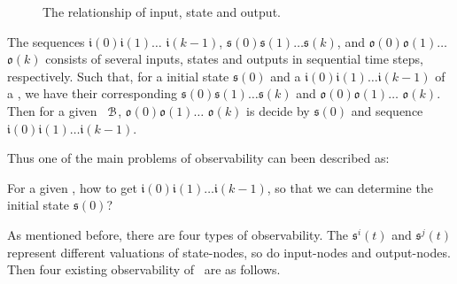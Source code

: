  \begin{figure}[thpb]
      \centering
      
      \caption{The relationship of input, state and output.}
      \label{fig:10}
  \end{figure}
   The sequences $\mathfrak{i}(0)$$\mathfrak{i}(1)\ldots$
$\mathfrak{i}(k-1)$,  $\mathfrak{s}(0) $$\mathfrak{s}(1)\ldots$$\mathfrak{s}(k)$, and $\mathfrak{o}(0)$$\mathfrak{o}(1)\ldots$$\mathfrak{o}(k)$ 
 consists of several inputs, states and outputs  in sequential time steps,  respectively. 
 Such that, for a initial state $\mathfrak{s}(0)$ and a $\mathfrak{i}(0)$$\mathfrak{i}(1)\ldots$$\mathfrak{i}(k-1)$ of a \BCN, we have their corresponding 
$\mathfrak{s}(0)$$\mathfrak{s}(1)\ldots $$\mathfrak{s}(k)$ and $\mathfrak{o}(0) $$\mathfrak{o}(1)\ldots$ $\mathfrak{o}(k)$.  
Then for a given  \BCN\  ${\mathcal{B}}$,  $\mathfrak{o}(0)$$\mathfrak{o}(1)\ldots$ $\mathfrak{o}(k)$ is decide by
$\mathfrak{s}(0)$ and sequence $\mathfrak{i}(0)$$\mathfrak{i}(1)\ldots$$\mathfrak{i}(k-1)$. 
 
 Thus one of the main problems of observability can been described as: 
\begin{problem}
\label{pro:1}
For a given  \BCN, how to get $\mathfrak{i}(0)$$\mathfrak{i}(1)\ldots$$\mathfrak{i}(k-1)$, so that we can determine the initial state $\mathfrak{s}(0)$?
\end{problem}

As  mentioned before, there are four types of observability. 
The $\mathfrak{s}^{i}(t)$ and $\mathfrak{s}^{j}(t)$ represent different valuations of state-nodes, so do input-nodes and output-nodes. Then four existing observability of \BCNs\ are as follows. 

